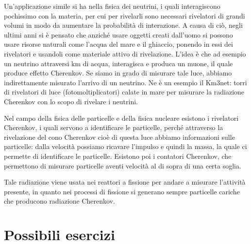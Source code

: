 Un'applicazione simile si ha nella fisica dei neutrini, i quali interagiscono pochissimo con la materia, per cui per rivelarli sono necessari rivelatori di grandi volumi in modo da aumentare la probabilità di interazione. A causa di ciò, negli ultimi anni si è pensato che anziché usare oggetti creati dall'uomo si possono usare risorse naturali come l'acqua del mare e il ghiaccio, ponendo in essi dei rivelatori e usandoli come materiale attivo di rivelazione. L'idea è che ad esempio un neutrino attraversi km di acqua, interagisca e produca un muone, il quale produce effetto Cherenkov. Se siamo in grado di misurare tale luce, abbiamo indirettamente misurato l'arrivo di un neutrino. Ne è un esempio il Km3net: torri di rivelatori di luce (fotomoltiplicatori) calate in mare per misurare la radiazione Cherenkov con lo scopo di rivelare i neutrini.

Nel campo della fisica delle particelle e della fisica nucleare esistono i rivelatori Cherenkov, i quali servono a identificare le particelle, perché attraverso la rivelazione del cono Cherenkov cioè di questa luce abbiamo informazioni sulle particelle: dalla velocità possiamo ricavare l'impulso e quindi la massa, la quale ci permette di identificare le particelle. Esistono poi i contatori Cherenkov, che permettono di misurare particelle aventi velocità al di sopra di una certa soglia.

Tale radiazione viene usata nei reattori a fissione per andare a misurare l'attività presente, in quanto nei processi di fissione si generano sempre particelle cariche che producono radiazione Cherenkov.

\section{Possibili esercizi}

